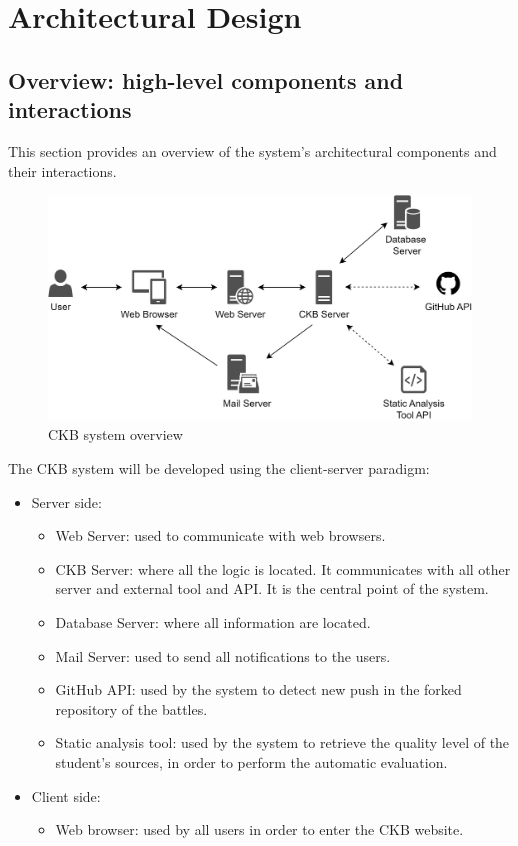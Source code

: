 \chapter{Architectural Design}
\section{Overview: high-level components and interactions}\label{sec: overview}
This section provides an overview of the system's architectural components and their interactions.

\begin{figure}[h]
    \centering
    \includegraphics[width=\linewidth]{images/hl-system.png}
    \caption{CKB system overview}
    \label{fig:CKBoverview}
\end{figure}

The CKB system will be developed using the client-server paradigm:
\begin{itemize}
    \item Server side:
    \begin{itemize}
        \item Web Server: used to communicate with web browsers.
        \item CKB Server: where all the logic is located. It communicates with all other server and external tool and API. It is the central point of the system.
        \item Database Server: where all information are located.
        \item Mail Server: used to send all notifications to the users.
        \item GitHub API: used by the system to detect new push in the forked repository of the battles.
        \item Static analysis tool: used by the system to retrieve the quality level of the student's sources, in order to perform the automatic evaluation. 
    \end{itemize}
    \item Client side:
    \begin{itemize}
        \item Web browser: used by all users in order to enter the CKB website.
    \end{itemize}
\end{itemize}

